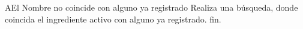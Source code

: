                  \begin{UCtrayectoriaA}{A}{El Nombre no coincide con alguno ya registrado}
			\UCpaso Realiza una búsqueda, donde coincida el ingrediente activo con alguno ya registrado.
                        \UCpaso fin.
		\end{UCtrayectoriaA}
		

